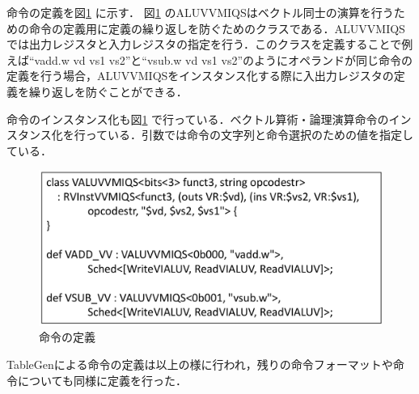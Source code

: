 命令の定義を図\ref{fig:Inst_def}
に示す．
図\ref{fig:Inst_def}
のALUVVMIQSはベクトル同士の演算を行うための命令の定義用に定義の繰り返しを防ぐためのクラスである．ALUVVMIQSでは出力レジスタと入力レジスタの指定を行う．このクラスを定義することで例えば``vadd.w vd vs1 vs2''と``vsub.w vd vs1 vs2''のようにオペランドが同じ命令の定義を行う場合，ALUVVMIQSをインスタンス化する際に入出力レジスタの定義を繰り返しを防ぐことができる．

命令のインスタンス化も図\ref{fig:Inst_def}
で行っている．ベクトル算術・論理演算命令のインスタンス化を行っている．引数では命令の文字列と命令選択のための値を指定している．

\begin{figure}[tb]
    \centering
    \includegraphics[scale=0.6]{image/Instruction_define.pdf}
    \caption{命令の定義}
    \label{fig:Inst_def}
\end{figure}

TableGenによる命令の定義は以上の様に行われ，残りの命令フォーマットや命令についても同様に定義を行った．